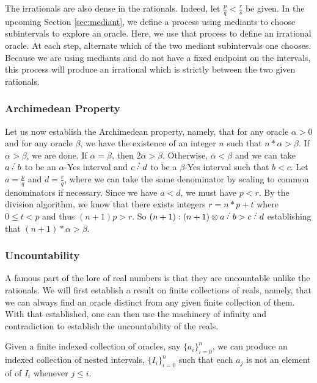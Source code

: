 \documentclass[12pt]{article}
\begin{document}
The irrationals are also dense in the rationals. Indeed, let $\frac{p}{q} <\frac{r}{s}$ be given. In the upcoming Section \ref{sec:mediant}, we define a process using mediants to choose subintervals to explore an oracle. Here, we use that process to define an irrational oracle. At each step, alternate which of the two mediant subintervals one chooses. Because we are using mediants and do not have a fixed endpoint on the intervals, this process will produce an irrational which is strictly between the two given rationals. 

\subsubsection{Archimedean Property}

Let us now establish the Archimedean property, namely, that for any oracle $\alpha > 0$ and for any oracle $\beta$, we have the existence of an integer $n$ such that $n * \alpha > \beta $. If $\alpha > \beta$, we are done. If $\alpha = \beta$, then $2 \alpha > \beta$. Otherwise, $\alpha < \beta$ and we can take $a\lte b$ to be an $\alpha$-Yes interval and $c \lte d$ to be a $\beta$-Yes interval such that $b < c$. Let $a = \frac{p}{q}$ and $d = \frac{r}{q}$, where we can take the same denominator by scaling to common denominators if necessary. Since we have $a<d$, we must have $p < r$. By the division algorithm, we know that there exists integers $r = n*p + t$ where $0 \leq  t<p$ and thus $(n+1)p > r$. So $(n+1):(n+1) \otimes a\lte b > c\lte d$ establishing that $(n+1)*\alpha > \beta$.

\subsubsection{Uncountability}

A famous part of the lore of real numbers is that they are uncountable unlike the rationals. We will first establish a result on finite collections of reals, namely, that we can always find an oracle distinct from any given finite collection of them. With that established, one can then use the machinery of infinity and contradiction to establish the uncountability of the reals. 

\begin{proposition}\label{pr:notlist}
Given a finite indexed collection of oracles, say $\{a_i\}_{i=0}^n$, we can produce an indexed collection of nested intervals, $\{I_i\}_{i=0}^n$ such that each $a_j$ is not an element of of $I_i$ whenever $j \leq i$.
\end{proposition}
\end{document}

